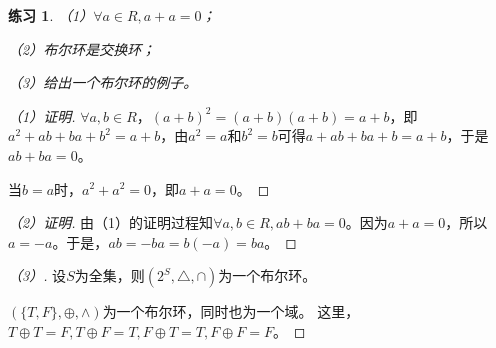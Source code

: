 \documentclass{article}
\newtheorem{Exercise}{练习}
\begin{document}
\begin{CJK*}{UTF8}{gbsn}
\begin{Exercise}
  （1）$\forall a\in R, a+a =0$；

  （2）布尔环是交换环；

  （3）给出一个布尔环的例子。
\end{Exercise}

\begin{proof}[（1）证明]
  $\forall a,b\in R$，$(a+b)^2=(a+b)(a+b)=a+b$，即$a^2+ab+ba+b^2=a+b$，由$a^2=a$和$b^2=b$可得$a+ab+ba+b=a+b$，于是$ab+ba=0$。

  当$b=a$时，$a^2+a^2=0$，即$a+a=0$。
\end{proof}

\begin{proof}[（2）证明]
  由（1）的证明过程知$\forall a,b\in R, ab+ba=0$。因为$a+a=0$，所以$a=-a$。于是，$ab=-ba=b(-a)=ba$。
\end{proof}

\begin{proof}[（3）]
  设$S$为全集，则$(2^S,\bigtriangleup,\cap)$为一个布尔环。

  $(\{T,F\},\oplus, \land)$为一个布尔环，同时也为一个域。
这里，$T\oplus T= F, T\oplus F = T, F\oplus T=T, F\oplus F=F$。
\end{proof}

\end{CJK*}
\end{document}
